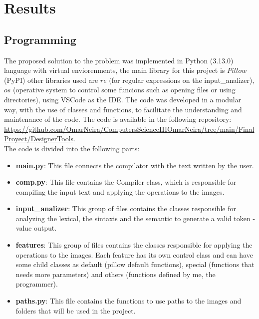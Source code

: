 \section{Results}
\subsection{Programming}

The proposed solution to the problem was implemented in Python (3.13.0) language with virtual enviorenments, the main library for this project is $Pillow$ (PyPI) other libraries used are $re$ (for regular expressions on the input\_analizer), $os$ (operative system to control some funcions such as opening files or using directories), using VSCode as the IDE. The code was developed in a modular way, with the use of classes and functions, to facilitate the understanding and maintenance of the code. The code is available in the following repository: \url{https://github.com/OmarNeira/ComputersScienceIIIOmarNeira/tree/main/FinalProyect/DesignerTools}.\\
The code is divided into the following parts:
\begin{itemize}
    \item \textbf{main.py}: This file connects the compilator with the text written by the user.
    \item \textbf{comp.py}: This file contains the Compiler class, which is responsible for compiling the input text and applying the operations to the images.
    \item \textbf{input\_analizer}: This group of files contains the classes responsible for analyzing the lexical, the sintaxis and the semantic to generate a valid token - value output.
    \item \textbf{features}: This group of files contains the classes responsible for applying the operations to the images. Each feature has its own control class and can have some child classes as default (pillow default functions), special (functions that needs more parameters) and others (functions defined by me, the programmer).
    \item \textbf{paths.py}: This file contains the functions to use paths to the images and folders that will be used in the project.
\end{itemize}

